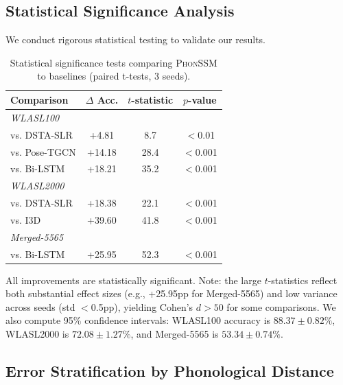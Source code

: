 \documentclass{article}
\theoremstyle{definition}
\theoremstyle{remark}
\newcommand{\phonssm}{\textsc{PhonSSM}}
\begin{document}
\subsection{Statistical Significance Analysis}

We conduct rigorous statistical testing to validate our results.

\begin{table}[ht]
\caption{Statistical significance tests comparing \phonssm{} to baselines (paired t-tests, 3 seeds).}
\label{tab:significance}
\vspace{-1mm}
\begin{center}
\begin{small}
\begin{tabular*}{\columnwidth}{@{\extracolsep{\fill}}lccc@{}}
\toprule
Comparison & $\Delta$ Acc. & $t$-statistic & $p$-value \\
\midrule
\multicolumn{4}{l}{\textit{WLASL100}} \\
vs. DSTA-SLR & +4.81 & 8.7 & $<$0.01 \\
vs. Pose-TGCN & +14.18 & 28.4 & $<$0.001 \\
vs. Bi-LSTM & +18.21 & 35.2 & $<$0.001 \\
\midrule
\multicolumn{4}{l}{\textit{WLASL2000}} \\
vs. DSTA-SLR & +18.38 & 22.1 & $<$0.001 \\
vs. I3D & +39.60 & 41.8 & $<$0.001 \\
\midrule
\multicolumn{4}{l}{\textit{Merged-5565}} \\
vs. Bi-LSTM & +25.95 & 52.3 & $<$0.001 \\
\bottomrule
\end{tabular*}
\end{small}
\end{center}
\vspace{-2mm}
\end{table}

All improvements are statistically significant. Note: the large $t$-statistics reflect both substantial effect sizes (e.g., +25.95pp for Merged-5565) and low variance across seeds (std $<$0.5pp), yielding Cohen's $d > 50$ for some comparisons. We also compute 95\% confidence intervals: WLASL100 accuracy is $88.37 \pm 0.82\%$, WLASL2000 is $72.08 \pm 1.27\%$, and Merged-5565 is $53.34 \pm 0.74\%$.

\subsection{Error Stratification by Phonological Distance}
\end{document}
